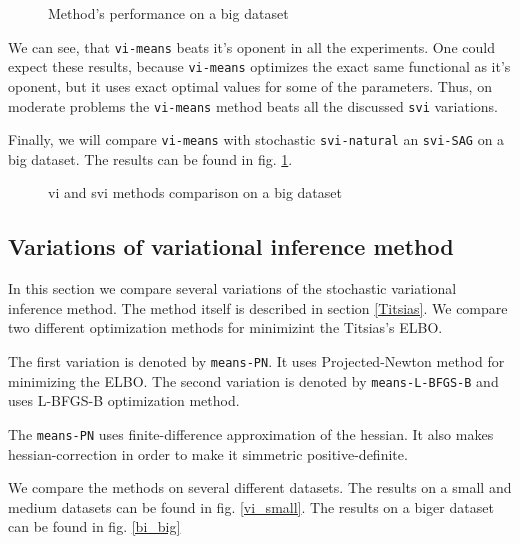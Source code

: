 \documentclass[12pt]{article}
\begin{document}
	\begin{figure}[!h]
		\centering
		\subfloat{
			\scalebox{0.75}{
		    	
			}
		}
		\caption{Method's performance on a big dataset}
	\end{figure}

	We can see, that \lstinline{vi-means} beats it's oponent in all the experiments. One could expect these results, because \lstinline{vi-means} optimizes the exact same functional as it's oponent, but it uses exact optimal values for some of the parameters. Thus, on moderate problems the \lstinline{vi-means} method beats all the discussed \lstinline{svi} variations.

	Finally, we will compare \lstinline{vi-means} with stochastic \lstinline{svi-natural} an \lstinline{svi-SAG} on a big dataset. The results can be found in fig. \ref{visvi_big}.

	\begin{figure}[!h]
		\centering
		\caption{vi and svi methods comparison on a big dataset}
		\label{visvi_big}
	\end{figure}

\subsection{Variations of variational inference method}
	In this section we compare several variations of the stochastic variational inference method. The method itself is described in section \ref{Titsias}. We compare two different optimization methods for minimizint the Titsias's ELBO.

	The first variation is denoted by \lstinline{means-PN}. It uses Projected-Newton method for minimizing the ELBO. The second variation is denoted by \lstinline{means-L-BFGS-B} and uses L-BFGS-B optimization method.

	The \lstinline{means-PN} uses finite-difference approximation of the hessian. It also makes hessian-correction in order to make it simmetric positive-definite.

	We compare the methods on several different datasets. The results on a small and medium datasets can be found in fig. \ref{vi_small}. The results on a biger dataset can be found in fig. \ref{bi_big}
\end{document}
